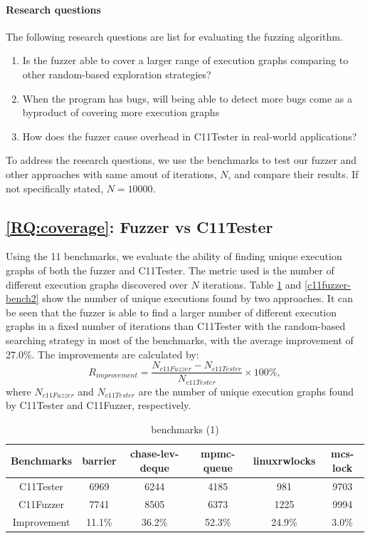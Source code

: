 \paragraph*{Research questions} The following research questions are list for evaluating the fuzzing algorithm.
\begin{enumerate}[label=RQ\arabic*]
	\item Is the fuzzer able to cover a larger range of execution graphs comparing to other random-based exploration strategies? \label{RQ:coverage}
	\item When the program has bugs, will being able to detect more bugs come as a byproduct of covering more execution graphs \label{RQ:bug}
	\item How does the fuzzer cause overhead in C11Tester in real-world applications? \label{RQ:overhead}
\end{enumerate}

To address the research questions, we use the benchmarks to test our fuzzer and other approaches with same amout of iterations, $N$, and compare their results. If not specifically stated, $N = 10000$.

\subsection{\ref*{RQ:coverage}: Fuzzer vs C11Tester}

Using the 11 benchmarks, we evaluate the ability of finding unique execution graphs of both the fuzzer and C11Tester. The metric used is the number of different execution graphs discovered over $N$ iterations. Table \ref{c11fuzzer-bench1} and \ref{c11fuzzer-bench2} show the number of unique executions found by two approaches. It can be seen that the fuzzer is able to find a larger number of different execution graphs in a fixed number of iterations than C11Tester with the random-based searching strategy in most of the benchmarks, with the average improvement of 27.0\%. The improvements are calculated by:
\[
    R_{improvement} = \frac{N_{c11Fuzzer} - N_{c11Tester} }{N_{c11Tester} } \times 100 \% ,
\]
where $N_{c11Fuzzer}$ and $N_{c11Tester}$ are the number of unique execution graphs found by C11Tester and C11Fuzzer, respectively. 

\begin{table}[h!]
	\begin{tabular}{ |c|ccccc| }
		\hline
		Benchmarks  & barrier & chase-lev-deque & mpmc-queue & linuxrwlocks & mcs-lock \\
		\hline 
		C11Tester   & 6969    & 6244            & 4185       & 981          & 9703     \\
		C11Fuzzer   & 7741    & 8505            & 6373       & 1225         & 9994     \\
		\hline
        Improvement & 11.1\%  & 36.2\%          & 52.3\%     & 24.9\%       & 3.0\%     \\
        \hline
	\end{tabular}
	\caption{benchmarks (1)}
	\label{c11fuzzer-bench1}

\end{table}

